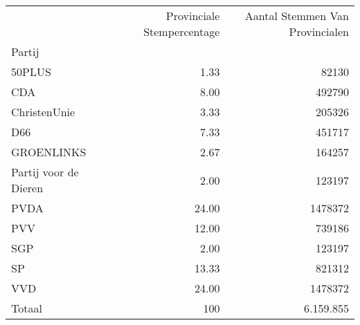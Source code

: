 \begin{tabular}{lrr}
\toprule
{} &  Provinciale Stempercentage &  Aantal Stemmen Van Provincialen \\
Partij                &                             &                                  \\
\midrule
50PLUS                &                        1.33 &                            82130 \\
CDA                   &                        8.00 &                           492790 \\
ChristenUnie          &                        3.33 &                           205326 \\
D66                   &                        7.33 &                           451717 \\
GROENLINKS            &                        2.67 &                           164257 \\
Partij voor de Dieren &                        2.00 &                           123197 \\
PVDA                  &                       24.00 &                          1478372 \\
PVV                   &                       12.00 &                           739186 \\
SGP                   &                        2.00 &                           123197 \\
SP                    &                       13.33 &                           821312 \\
VVD                   &                       24.00 &                          1478372 \\
\midrule
Totaal					&					100	&								6.159.855\\
\bottomrule
\end{tabular}
